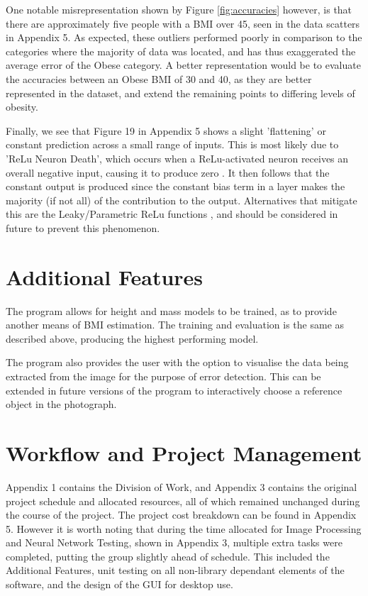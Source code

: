 \documentclass[conference]{IEEEtran}
\begin{document}
One notable misrepresentation shown by Figure \ref{fig:accuracies} however, is that there are approximately five people with a BMI over 45, seen in the data scatters in Appendix 5.
As expected, these outliers performed poorly in comparison to the categories where the majority of data was located, and has thus exaggerated the average error of the Obese category.
A better representation would be to evaluate the accuracies between an Obese BMI of 30 and 40, as they are better represented in the dataset, and extend the remaining points to differing levels of obesity.

Finally, we see that Figure 19 in Appendix 5 shows a slight 'flattening' or constant prediction across a small range of inputs.
This is most likely due to 'ReLu Neuron Death', which occurs when a ReLu-activated neuron receives an overall negative input, causing it to produce zero \cite{reludeath}.
It then follows that the constant output is produced since the constant bias term in a layer makes the majority (if not all) of the contribution to the output.
Alternatives that mitigate this are the Leaky/Parametric ReLu functions \cite{reludeath}, and should be considered in future to prevent this phenomenon.

\section{Additional Features}
The program allows for height and mass models to be trained, as to provide another means of BMI estimation.
The training and evaluation is the same as described above, producing the highest performing model.

The program also provides the user with the option to visualise the data being extracted from the image for the purpose of error detection.
This can be extended in future versions of the program to interactively choose a reference object in the photograph.

\section{Workflow and Project Management}
Appendix 1 contains the Division of Work, and Appendix 3 contains the original project schedule and allocated resources, all of which remained unchanged during the course of the project.
The project cost breakdown can be found in Appendix 5.
However it is worth noting that during the time allocated for Image Processing and Neural Network Testing, shown in Appendix 3, multiple extra tasks were completed, putting the group slightly ahead of schedule.
This included the Additional Features, unit testing on all non-library dependant elements of the software, and the design of the GUI for desktop use.
\end{document}
